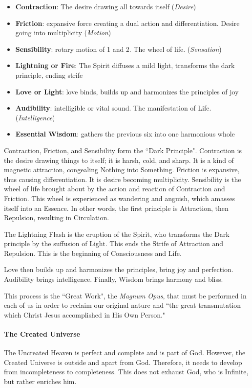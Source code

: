 \begin{itemize}
\item \textbf{Contraction}: The desire drawing all towards itself (\emph{Desire}) 
\item \textbf{Friction}: expansive force creating a dual action and differentiation. Desire going into multiplicity (\emph{Motion}) 
\item \textbf{Sensibility}: rotary motion of 1 and 2. The wheel of life. (\emph{Sensation}) 
\item \textbf{Lightning or Fire}: The Spirit diffuses a mild light, transforms the dark principle, ending strife 
\item \textbf{Love or Light}: love binds, builds up and harmonizes the principles of joy 
\item \textbf{Audibility}: intelligible or vital sound. The manifestation of Life. (\emph{Intelligence}) 
\item \textbf{Essential Wisdom}: gathers the previous six into one harmonious whole 
\end{itemize}
Contraction, Friction, and Sensibility form the ``Dark Principle". Contraction is the desire drawing things to itself; it is harsh, cold, and sharp. It is a kind of magnetic attraction, congealing Nothing into Something. Friction is expansive, thus causing differentiation. It is desire becoming multiplicity. Sensibility is the wheel of life brought about by the action and reaction of Contraction and Friction. This wheel is experienced as wandering and anguish, which amasses itself into an Essence. In other words, the first principle is Attraction, then Repulsion, resulting in Circulation.

The Lightning Flash is the eruption of the Spirit, who transforms the Dark principle by the suffusion of Light. This ends the Strife of Attraction and Repulsion. This is the beginning of Consciousness and Life.

Love then builds up and harmonizes the principles, bring joy and perfection. Audibility brings intelligence. Finally, Wisdom brings harmony and bliss.

This process is the ``Great Work", the \emph{Magnum Opus}, that must be performed in each of us in order to reclaim our original nature and ``the great transmutation which Christ Jesus accomplished in His Own Person."

\paragraph{The Created Universe}
The Uncreated Heaven is perfect and complete and is part of God. However, the Created Universe is outside and apart from God. Therefore, it needs to develop from incompleteness to completeness. This does not exhaust God, who is Infinite, but rather enriches him.

